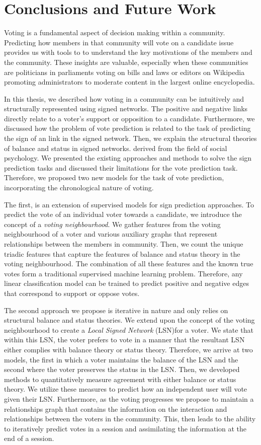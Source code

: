 \chapter{Conclusions and Future Work}
\label{chp:conclusion}
Voting is a fundamental aspect of decision making within a community.
Predicting how members in that community will vote on a candidate issue provides us with tools to to understand the key motivations of the members and the community.
These insights are valuable, especially when these communities are politicians in parliaments voting on bills and laws or editors on Wikipedia promoting administrators to moderate content in the largest online encyclopedia.

In this thesis, we described how voting in a community can be intuitively and structurally represented using signed networks.
The positive and negative links directly relate to a voter's support or opposition to a candidate.
Furthermore, we discussed how the problem of vote prediction is related to the task of predicting the sign of an link in the signed network.
Then, we explain the structural theories of balance and status in signed networks. derived from the field of social psychology.
We presented the existing approaches and methods to solve the sign prediction tasks and discussed their limitations for the vote prediction task.
Therefore, we proposed two new models for the task of vote prediction, incorporating the chronological nature of voting.

The first, is an extension of supervised models for sign prediction approaches.
To predict the vote of an individual voter towards a candidate, we introduce the concept of a \textit{voting neighbourhood}.
We gather features from the voting neighbourhood of a voter and various auxiliary graphs that represent relationships between the members in community.
Then, we count the unique triadic features that capture the features of balance and status theory in the voting neighbourhood.
The combination of all these features and the known true votes form a traditional supervised machine learning problem.
Therefore, any linear classification model can be trained to predict positive and negative edges that correspond to support or oppose votes.

The second approach we propose is iterative in nature and only relies on structural balance and status theories.
We extend upon the concept of the voting neighbourhood to create a \textit{Local Signed Network} (LSN)for a voter.
We state that within this LSN, the voter prefers to vote in a manner that the resultant LSN either complies with balance theory or status theory.
Therefore, we arrive at two models, the first in which a voter maintains the balance of the LSN and the second where the voter preserves the status in the LSN.
Then, we developed methods to quantitatively measure agreement with either balance or status theory.
We utilize these measures to predict how an independent user will vote given their LSN.
Furthermore, as the voting progresses we propose to maintain a relationships graph that contains the information on the interaction and relationships between the voters in the community.
This, then leads to the ability to iteratively predict votes in a session and assimilating the information at the end of a session.


